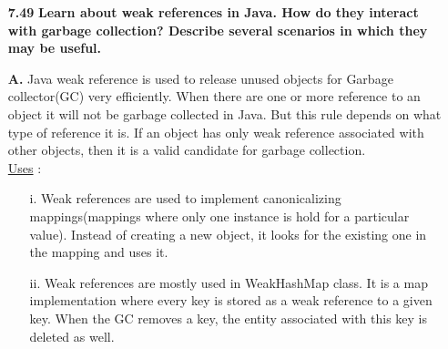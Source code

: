 \documentclass[letterpaper]{article}
\begin{document}
\begin{large}
\begin{flushleft}
\begin{enumerate}
\item[\textbf{7.49}]
\textbf{Learn about weak references in Java. How do they interact with garbage collection? Describe several scenarios in which they may be useful.}
\item[\textbf{A.}]
Java weak reference is used to release unused objects for Garbage collector(GC) very efficiently. When there are one or more reference to an object it will not be garbage collected in Java. But this rule depends on what type of reference it is. If an object has only weak reference associated with other objects, then it is a valid candidate for garbage collection. \\
\pagebreak
\underline{Uses} :\\
\begin{enumerate}
\item[i.]
Weak references are used to implement canonicalizing mappings(mappings where only one instance is hold for a particular value). Instead of creating a new object, it looks for the existing one in the mapping and uses it.\\
\item[ii.]
Weak references are mostly used in WeakHashMap class. It is a map implementation where every key is stored as a weak reference to a given key. When the GC removes a key, the entity associated with this key is deleted as well.\\[0.2in]
\end{enumerate}


\end{enumerate}
\end{flushleft}
\end{large}
\end{document}
